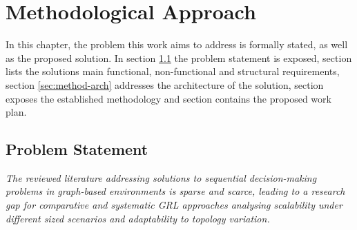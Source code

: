 \chapter{Methodological Approach} \label{chap:method}

In this chapter, the problem this work aims to address is formally stated, as well as the proposed solution. In section \ref{sec:method-statement} the problem statement is exposed, section  lists the solutions main functional, non-functional and structural requirements, section \ref{sec:method-arch} addresses the architecture of the solution, section  exposes the established methodology and section  contains the proposed work plan.

\section{Problem Statement} \label{sec:method-statement}

\begin{displayquote}
	 \textit{The reviewed literature addressing solutions to sequential decision-making problems in graph-based environments is sparse and scarce, leading to a research gap for comparative and systematic \ac{GRL} approaches analysing scalability under different sized scenarios and adaptability to topology variation.}
\end{displayquote}

